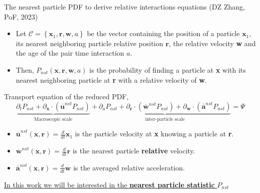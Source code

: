 \documentclass{sintefbeamer}
\newcommand{\nstavg}[1]{\overline{#1}^{nst}}
\newcommand{\ddt}{\frac{d}{d t}}
\newcommand{\pddt}{\partial_t}
\begin{document}
\begin{frame}{The nearest particle PDF to derive relative interactions equations (DZ Zhang, PoF, 2023)}
  \begin{definition}
    \begin{itemize}
      \item Let $\mathscr{C} =\left\{\textbf{x}_1, \textbf{r}, \textbf{w},a\right\}$ be the vector containing the position of a particle $\textbf{x}_1$, its nearest neighboring particle relative position $\textbf{r}$, the relative velocity \textbf{w} and the age of the pair time interaction $a$.
      \item Then, $P_{nst}(\textbf{x},\textbf{r},\textbf{w},a) $ is the probability of finding a particle at \textbf{x} with its nearest neighboring particle at \textbf{r} with a relative velocity of \textbf{w}. 
    \end{itemize}
  \end{definition}
  Transport equation of the reduced PDF,
  \begin{equation*}
    \underbrace{
      \pddt P_{nst}
      +  \partial_{\textbf{x}} \cdot
      \left(
        \nstavg{\textbf{u}}
        P_{nst}
      \right)
    }_{\text{Macroscopic scale}}
    + 
    \underbrace{
       \partial_a 
        P_{nst}
      + \partial_{\textbf{r}} \cdot
    \left(
        \nstavg{\textbf{w}}
        P_{nst}
    \right)
      +  \partial_{\textbf{w}} \cdot
    \left(
        \nstavg{\textbf{a}}
        P_{nst}
    \right)
    }_{\text{inter-particle scale}}
    = \Psi
    \label{eq:dt_P_nst}
\end{equation*}

  \begin{itemize}
    \item $\nstavg{\textbf{u}}(\textbf{x},\textbf{r}) = \ddt \textbf{x}_1$ is the particle velocity at \textbf{x} knowing a particle at \textbf{r}. 
    \item $\nstavg{\textbf{w}}(\textbf{x},\textbf{r}) = \ddt \textbf{r}$ is the nearest particle \textbf{relative} velocity. 
    \item $\nstavg{\textbf{a}}(\textbf{x},\textbf{r}) = \ddt \textbf{w}$ is the averaged relative acceleration.
  \end{itemize}
  \underline{In this work we will be interested in the \textbf{nearest particle statistic} $P_{nst}$}
\end{frame}
\end{document}
